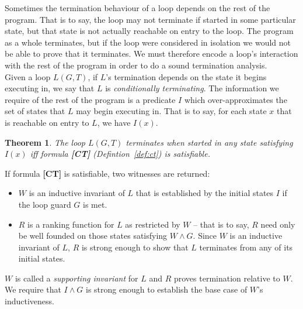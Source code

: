 \documentclass[preprint]{sigplanconf}
\newtheorem{theorem}{Theorem}
\theoremstyle{definition}
\begin{document}
Sometimes the termination behaviour of a loop depends on the rest of the program.  That is to say,
the loop may not terminate if started in some particular state, but that state is
not actually reachable on entry to the loop.  The program as a whole
terminates, but if the loop were considered in isolation we would not be able to prove that
it terminates. We must therefore encode a loop's interaction with the rest of the program 
in order to do a sound termination analysis.\\

\iffalse
Let us assume that we have done some preprocessing of our program which has identified
loops, straight line code blocks and the control flow between these.  In particular,
the control flow analysis has determined which order these code blocks execute in,
and the nesting structure of the loops.
\fi

Given a loop $L(G,T)$, if $L$'s termination depends on the state it begins
executing in, we say that $L$ is \emph{conditionally terminating}.
The information we require of the rest of the program is a predicate $I$ which
over-approximates the set of states that $L$ may begin executing in.
That is to say, for each state $x$ that is reachable on entry to $L$,
we have $I(x)$.

\begin{theorem}
\label{thm:ct}
 The loop $L(G, T)$ terminates when started in any state satisfying $I(x)$ iff formula {\bf [CT]}
 (Defintion~\ref{def:ct}) is satisfiable.
\end{theorem}
% 

If formula {\bf [CT]} is satisfiable, two witnesses are returned:
\begin{itemize}
\item $W$ is an inductive invariant of $L$ that is established by the initial states $I$ if the loop
guard $G$ is met.
\item $R$ is a ranking function for $L$ as restricted by $W$ -- that is to say, $R$ need only
be well founded on those states satisfying $W \wedge G$.  Since $W$ is an inductive invariant of $L$,
$R$ is strong enough to show that $L$ terminates from any of its initial states.
\end{itemize}

$W$ is called a \emph{supporting invariant} for $L$ and $R$ proves termination relative to $W$.
We require that $I \wedge G$ is strong enough to establish the base case of $W$'s inductiveness.
\end{document}
